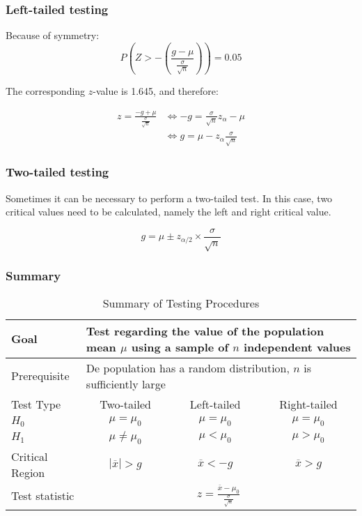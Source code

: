 \documentclass[aspectratio=169]{beamer}
\begin{document}
\begin{frame}
  \frametitle{Left-tailed testing}
  Because of symmetry: 
  \[ P\left(Z > - \left( \frac{g - \mu}{\frac{\sigma}{\sqrt{n}}} \right) \right) = 0.05 \]
  
  The corresponding $z$-value is 1.645, and therefore:
  
  \begin{align*}
  z = \frac{-g + \mu}{\frac{\sigma}{\sqrt{n}}} &\Leftrightarrow -g = \frac{\sigma}{\sqrt{n}} z_\alpha - \mu \\
  & \Leftrightarrow g = \mu - z_\alpha \frac{\sigma}{\sqrt{n}}
  \end{align*}
  
\end{frame}

\begin{frame}
  \frametitle{Two-tailed testing}
  Sometimes it can be necessary to perform a two-tailed test. In this case, two critical values need to be calculated, namely the left and right critical value.
  
  \begin{equation}
  g = \mu \pm z_{\alpha/2} \times \frac{\sigma}{\sqrt{n}}
  \label{eq:critical-values}
  \end{equation}
\end{frame}

\begin{frame}[plain]
  \frametitle{Summary}
  
  \begin{table}
    \centering
    \begin{tabular}{l|ccc}
      \toprule
      Goal              & \multicolumn{3}{l}{\parbox{.7\textwidth}{Test regarding the value of the population mean $\mu$ using a sample of $n$ independent values}} \\
      \midrule
      Prerequisite      & \multicolumn{3}{l}{\parbox{.7\textwidth}{De population has a random distribution, $n$ is sufficiently large}} \\
      \midrule
      Test Type         & Two-tailed           & Left-tailed & Right-tailed \\
      \midrule
      $H_{0}$           & $\mu = \mu_{0}$      & $\mu = \mu_{0}$ & $\mu = \mu_{0}$  \\
      $H_{1}$           & $\mu \neq \mu_{0}$   & $\mu < \mu_{0}$ & $\mu > \mu_{0}$  \\
      Critical Region   & $\left|\overline{x}\right| > g$ & $\overline{x}< -g $        & $\overline{x}>g$            \\
      Test statistic    & \multicolumn{3}{c}{$z = \frac{\overline{x} - \mu_{0}}{\frac{\sigma}{\sqrt{n}}}$} \\
      \bottomrule
    \end{tabular}
    \caption{Summary of Testing Procedures}
    \label{tab:testing-procedures}
  \end{table}
\end{frame}
\end{document}
